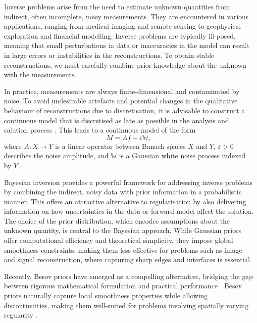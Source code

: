 \documentclass[11pt,a4paper]{article}
\begin{document}
Inverse problems arise from the need to estimate unknown quantities from indirect, often incomplete, noisy measurements. They are encountered in various applications, ranging from medical imaging and remote sensing to geophysical exploration and financial modelling. Inverse problems are typically ill-posed, meaning that small perturbations in data or inaccuracies in the model can result in large errors or instabilities in the reconstructions. To obtain stable reconstructions, we must carefully combine prior knowledge about the unknown with the measurements.

In practice, measurements are always finite-dimensional and contaminated by noise. To avoid undesirable artefacts and potential changes in the qualitative behaviour of reconstructions due to discretisation, it is advisable to construct a continuous model that is discretised as late as possible in the analysis and solution process \cite{Haario2004, Lassas2004, Stuart2010}. This leads to a continuous model of the form
\begin{equation*}\label{eq:IP_continuous}
M = Af + \varepsilon \mathbb{W},
\end{equation*}
where $A:X\to Y$ is a linear operator between Banach spaces $X$ and $Y$, $\varepsilon>0$ describes the noise amplitude, and $\mathbb{W}$ is a Gaussian white noise process indexed by $Y$ \cite{Reiss2008}. 

Bayesian inversion provides a powerful framework for addressing inverse problems by combining the indirect, noisy data with prior information in a probabilistic manner. This offers an attractive alternative to regularisation by also delivering information on how uncertainties in the data or forward model affect the solution.
The choice of the prior distribution, which encodes assumptions about the unknown quantity, is central to the Bayesian approach. While Gaussian priors offer computational efficiency and theoretical simplicity, they impose global smoothness constraints, making them less effective for problems such as image and signal reconstruction, where capturing sharp edges and interfaces is essential.

Recently, Besov priors have emerged as a compelling alternative, bridging the gap between rigorous mathematical formulation and practical performance \cite{Lassas2009, Dashti2012}. Besov priors naturally capture local smoothness properties while allowing discontinuities, making them well-suited for problems involving spatially varying regularity \cite{Bui2015, Cui2021, Hamalainen2013, Horst2025, Kolehmainen2012, Rantala2006, Suuronen2020, Wang2017}. 
\end{document}
